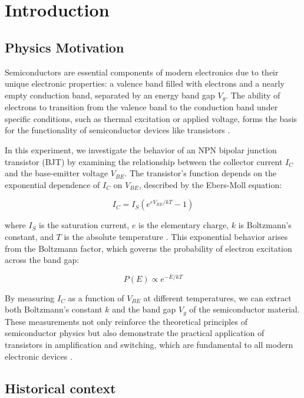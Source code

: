\documentclass[12pt,letterpaper,twocolumn]{article}
\begin{document}

\section{Introduction}

\subsection{Physics Motivation}

Semiconductors are essential components of modern electronics due to their unique electronic properties: a valence band filled with electrons and a nearly empty conduction band, separated by an energy band gap \( V_g \). The ability of electrons to transition from the valence band to the conduction band under specific conditions, such as thermal excitation or applied voltage, forms the basis for the functionality of semiconductor devices like transistors \cite{Thornton}.

In this experiment, we investigate the behavior of an NPN bipolar junction transistor (BJT) by examining the relationship between the collector current \( I_C \) and the base-emitter voltage \( V_{BE} \). The transistor’s function depends on the exponential dependence of \( I_C \) on \( V_{BE} \), described by the Ebers-Moll equation:

\[
I_C = I_S \left(e^{eV_{BE}/kT} - 1\right)
\]

where \( I_S \) is the saturation current, \( e \) is the elementary charge, \( k \) is Boltzmann’s constant, and \( T \) is the absolute temperature \cite{Neudeck}. This exponential behavior arises from the Boltzmann factor, which governs the probability of electron excitation across the band gap:

\[
P(E) \propto e^{-E/kT}
\]

By measuring \( I_C \) as a function of \( V_{BE} \) at different temperatures, we can extract both Boltzmann’s constant \( k \) and the band gap \( V_g \) of the semiconductor material. These measurements not only reinforce the theoretical principles of semiconductor physics but also demonstrate the practical application of transistors in amplification and switching, which are fundamental to all modern electronic devices \cite{Thornton}.


\subsection{Historical context}
\end{document}
